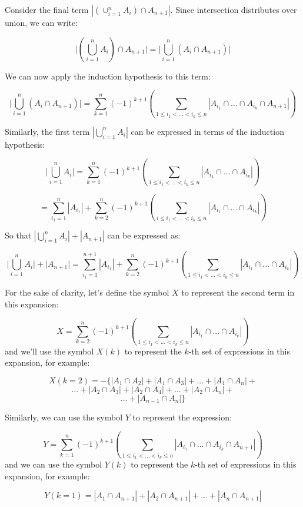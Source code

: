 \documentclass[a4paper,12pt]{article}
\begin{document}
Consider the final term $|\left(\cup_{i=1}^n A_i\right) \cap A_{n+1} |$. Since intersection distributes over union, we can write:

\[ \bigg| \left(\bigcup_{i=1}^n A_i\right) \cap A_{n+1}  \bigg| = \bigg| \bigcup_{i=1}^n \left(A_i \cap A_{n+1}\right) \bigg|\]

We can now apply the induction hypothesis to this term:

\[  \bigg| \bigcup_{i=1}^n \left(A_i \cap A_{n+1}\right) \bigg| = \sum_{k=1}^n(-1)^{k+1}\left(\sum_{1 \le i_1 < ... < i_k \le n} |A_{i_1} \cap ... \cap A_{i_k} \cap A_{n+1}|\right) \]

Similarly, the first term $|\bigcup_{i=1}^n A_i|$ can be expressed in terms of the induction hypothesis:

\[   \bigg| \bigcup_{i=1}^n A_i \bigg| = \sum_{k=1}^n(-1)^{k+1}\left(\sum_{1 \le i_1 < ... < i_k \le n} |A_{i_1} \cap ... \cap A_{i_k}|\right) \]

\[ = \sum_{i_1=1}^n |A_{i_1}| + \sum_{k=2}^n \left(-1\right)^{k+1} \left(\sum_{i \le i_1 < ... < i_k \le n} |A_{i_1} \cap ... \cap A_{i_k} |\right)\]

So that $|\bigcup_{i=1}^nA_i| + |A_{n+1}|$ can be expressed as:

\[ \bigg|\bigcup_{i=1}^n A_i\bigg| + \bigg|A_{n+1}\bigg| = \sum_{i_1=1}^{n+1} |A_{i_1}| + \sum_{k=2}^n \left(-1\right)^{k+1} \left(\sum_{1 \le i_1 < ... < i_k \le n} |A_{i_1} \cap ... \cap A_{i_k} |\right) \]

For the sake of clarity, let's define the symbol $X$ to represent the second term in this expansion:

\[ X = \sum_{k=2}^n (-1)^{k+1} \left(\sum_{1 \le i_1 < ... < i_k \le n} |A_{i_1} \cap ... \cap A_{i_k}| \right) \]
and we'll use the symbol $X(k)$ to represent the $k$-th set of expressions in this expansion, for example:

\[ X(k=2) = -\{|A_1 \cap A_2| + |A_1 \cap A_3| + ... + |A_1 \cap A_n| + \]
\[ ... + |A_2 \cap A_3| + |A_2 \cap A_4| + ... + |A_2 \cap A_n| + \]
\[ ... + |A_{n-1} \cap A_n| \} \]

Similarly, we can use the symbol $Y$ to represent the expression:

\[ Y =  \sum_{k=1}^n(-1)^{k+1}\left(\sum_{1 \le i_1 < ... < i_k \le n} |A_{i_1} \cap ... \cap A_{i_k} \cap A_{n+1}|\right) \]
and we can use the symbol $Y(k)$ to represent the $k$-th set of expressions in this expansion, for example:

\[ Y(k=1) = |A_1 \cap A_{n+1}| + |A_2 \cap A_{n+1}| + ... + |A_n \cap A_{n+1}| \]
\end{document}
